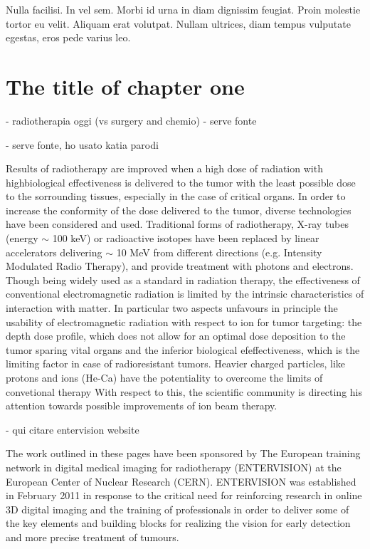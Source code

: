 \begin{savequote}[75mm] 
Nulla facilisi. In vel sem. Morbi id urna in diam dignissim feugiat. Proin molestie tortor eu velit. Aliquam erat volutpat. Nullam ultrices, diam tempus vulputate egestas, eros pede varius leo.
\end{savequote}

\chapter{The title of chapter one}

- radiotherapia oggi (vs surgery and chemio) - serve fonte

- serve fonte, ho usato katia parodi

Results of radiotherapy are improved when a high dose of radiation with highbiological effectiveness is delivered to the tumor with the least possible dose to the sorrounding tissues, especially in the case of critical organs.
In order to increase the conformity of the dose delivered to the tumor, diverse technologies have been considered and used.
Traditional forms of radiotherapy, X-ray tubes (energy $\sim$ 100 keV) or radioactive isotopes have been replaced by linear accelerators delivering $\sim$ 10 MeV from different directions (e.g. Intensity Modulated Radio Therapy), and provide treatment with photons and electrons.
Though being widely used as a standard in radiation therapy, the effectiveness of conventional electromagnetic radiation is limited by the intrinsic characteristics of interaction with matter.
In particular two aspects unfavours in principle the usability of electromagnetic radiation with respect to ion for tumor targeting: the depth dose profile, which does not allow for an optimal dose deposition to the tumor sparing vital organs
and the inferior biological efeffectiveness, which is the limiting factor in case of radioresistant tumors.
Heavier charged particles, like protons and ions (He-Ca) have the potentiality to overcome the limits of convetional therapy With respect to this, the scientific community is directing his attention towards possible improvements of ion beam therapy.

- qui citare entervision website

The work outlined in these pages have been sponsored by  The European training network in digital medical imaging for radiotherapy (ENTERVISION) at the European Center of Nuclear Research (CERN). ENTERVISION was established in February 2011 in response to the critical need for reinforcing research in online 3D digital imaging and the training of professionals in order to deliver some of the key elements and building blocks for realizing the vision for early detection and more precise treatment of tumours.

